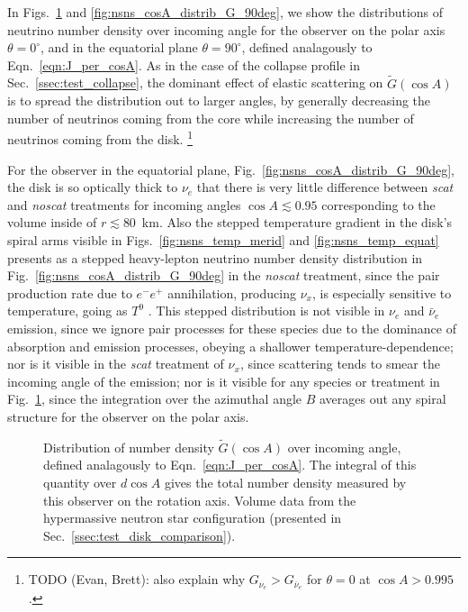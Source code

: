 \documentclass[aps,floatfix,prd,superscriptaddress,twocolumn]{revtex4-1}
\begin{document}
In Figs.~\ref{fig:nsns_cosA_distrib_G_00deg}
and \ref{fig:nsns_cosA_distrib_G_90deg}, we show the distributions of neutrino
number density over incoming angle
for the observer on the polar axis $\theta=0^\circ$,
and in the equatorial plane $\theta=90^\circ$,
defined analagously to Eqn.~\ref{eqn:J_per_cosA}.
As in the case of the collapse profile in Sec.~\ref{ssec:test_collapse},
the dominant effect of elastic scattering on $\tilde{G}(\cos A)$
is to spread the distribution out to larger angles, by generally decreasing
the number of neutrinos coming from the core while increasing the number
of neutrinos coming from the disk.
\footnote{TODO (Evan, Brett): also explain why $G_{\nu_e}>G_{\bar{\nu}_e}$
  for $\theta=0$ at $\cos A>0.995$.}

For the observer in the equatorial plane,
Fig.~\ref{fig:nsns_cosA_distrib_G_90deg}, the disk is so optically thick to
$\nu_e$ that there is very little difference between \emph{scat} and
\emph{noscat} treatments for incoming angles $\cos A \lesssim 0.95$
corresponding to the volume inside of $r \lesssim 80$~km.
Also the stepped temperature gradient in the disk's spiral arms visible in
Figs.~\ref{fig:nsns_temp_merid} and \ref{fig:nsns_temp_equat} presents as a
stepped heavy-lepton neutrino number density distribution in
Fig.~\ref{fig:nsns_cosA_distrib_G_90deg} in the \emph{noscat} treatment,
since the pair production rate due to $e^{-}e^{+}$ annihilation,
producing $\nu_x$, is especially sensitive to temperature, going as
$T^9$ \cite[Sec.~7]{burr2006-neutrino_opacities}.
This stepped distribution is not visible in $\nu_e$ and $\bar{\nu}_e$ emission,
since we ignore pair processes for these species due to the dominance of
absorption and emission processes, obeying a shallower temperature-dependence;
nor is it visible in the \emph{scat} treatment of $\nu_x$, since scattering
tends to smear the incoming angle of the emission;
nor is it visible for any species or treatment in
Fig.~\ref{fig:nsns_cosA_distrib_G_00deg}, since the integration over the
azimuthal angle $B$ averages out any spiral structure for the observer
on the polar axis.

\begin{figure}
  \resizebox{\columnwidth}{!}{}
  \caption{Distribution of number density $\tilde{G}(\cos A)$ over incoming angle,
    defined analagously to Eqn.~\ref{eqn:J_per_cosA}.
    The integral of this quantity over $d\cos A$ gives the total number density
    measured by this observer on the rotation axis.
    Volume data from the hypermassive neutron star configuration
    (presented in Sec.~\ref{ssec:test_disk_comparison}).}
  \label{fig:nsns_cosA_distrib_G_00deg}
\end{figure}
\end{document}
